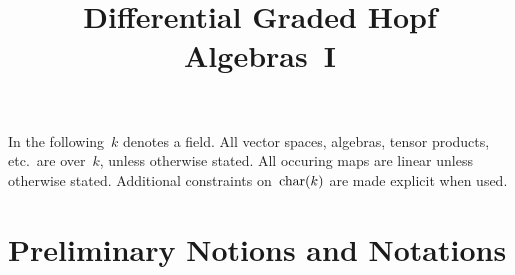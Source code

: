 \documentclass[a4paper,10pt,headings=standardclasses]{scrartcl}
\title{Differential Graded Hopf Algebras~I}
\author{}
\date{}
\begin{document}
\maketitle

\vspace{-4em}

In the following~$k$ denotes a field.
All vector spaces, algebras, tensor products, etc.\ are over~$k$, unless otherwise stated.
All occuring maps are linear unless otherwise stated.
Additional constraints on~$\operatorname{char}(k)$ are made explicit when used.





\section{Preliminary Notions and Notations}
\end{document}
